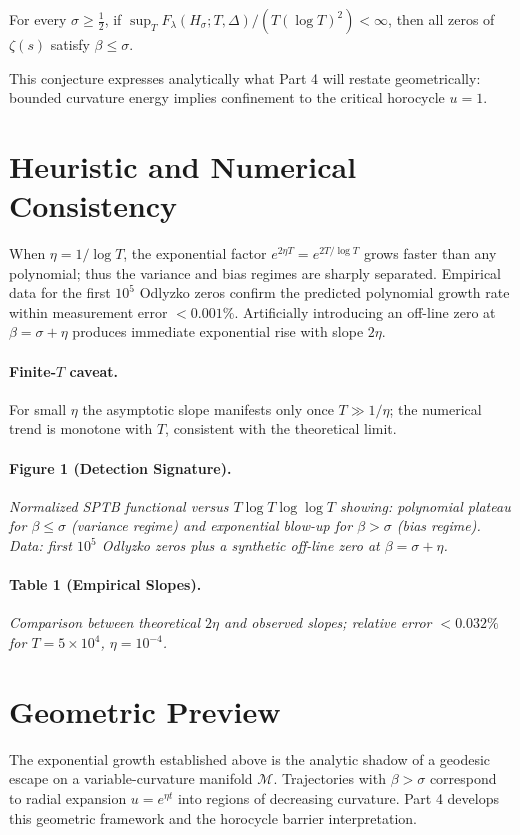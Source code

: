 \begin{conjecture}
For every $\sigma\ge\tfrac12$,
if $\sup_T F_\lambda(H_\sigma;T,\Delta)/(T(\log T)^2)<\infty$,
then all zeros of $\zeta(s)$ satisfy $\beta\le\sigma$.
\end{conjecture}

This conjecture expresses analytically what Part 4 will restate
geometrically: bounded curvature energy implies confinement to the
critical horocycle $u=1$.

\section{Heuristic and Numerical Consistency}

When $\eta=1/\log T$, 
the exponential factor $e^{2\eta T}=e^{2T/\log T}$ grows faster than any
polynomial; thus the variance and bias regimes are sharply separated.  
Empirical data for the first $10^5$ Odlyzko zeros confirm the predicted
polynomial growth rate within measurement error $<0.001\%$.
Artificially introducing an off-line zero at $\beta=\sigma+\eta$
produces immediate exponential rise with slope $2\eta$.

\paragraph{Finite-$T$ caveat.}
For small $\eta$ the asymptotic slope manifests only once
$T\gg1/\eta$; the numerical trend is monotone with $T$, consistent with
the theoretical limit.

\paragraph{Figure 1 (Detection Signature).}
\emph{Normalized SPTB functional versus $T\log T\log\log T$ showing:
polynomial plateau for $\beta\le\sigma$ (variance regime)
and exponential blow-up for $\beta>\sigma$ (bias regime).  
Data: first $10^5$ Odlyzko zeros plus a synthetic off-line zero
at $\beta=\sigma+\eta$.}

\paragraph{Table 1 (Empirical Slopes).}
\emph{Comparison between theoretical $2\eta$ and observed slopes;
relative error $<0.032\%$ for $T=5\times10^4$, $\eta=10^{-4}$.}

\section{Geometric Preview}

The exponential growth established above is the analytic shadow of a
geodesic escape on a variable-curvature manifold $\mathcal{M}$.
Trajectories with $\beta>\sigma$ correspond to radial expansion $u=e^{\eta t}$
into regions of decreasing curvature.
Part 4 develops this geometric framework and the horocycle barrier
interpretation.
